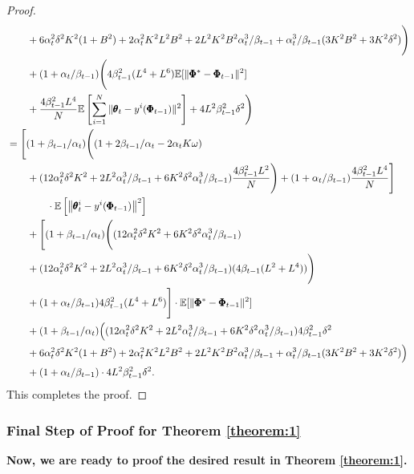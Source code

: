 \documentclass{article} %
\theoremstyle{plain}
\theoremstyle{definition}
\theoremstyle{remark}
\begin{document}
{\begin{proof}
\begin{align}
    &\qquad+6\alpha_t^2\delta^2K^2(1+B^2)+2\alpha_t^2K^2L^2B^2+2L^2K^2B^2\alpha_t^3/\beta_{t-1}+\alpha_t^3/\beta_{t-1}(3K^2B^2+3K^2\delta^2)\Bigg)\nonumber\allowdisplaybreaks\\
    &\qquad+(1+\alpha_t/\beta_{t-1})\Bigg(4\beta_{t-1}^2(L^4+L^6)\mathbb{E}[\|\pmb{\Phi}^*-\pmb{\Phi}_{t-1}\|^2]\nonumber\allowdisplaybreaks\\
    &\qquad+\frac{4\beta_{t-1}^2L^4}{N}\mathbb{E}\left[\sum_{i=1}^N\|\pmb{\theta}_{t}-y^i(\pmb{\Phi}_{t-1})\|^2\right]+4L^2\beta_{t-1}^2\delta^2\Bigg)\nonumber\allowdisplaybreaks\\
    &=\Bigg[(1+\beta_{t-1}/\alpha_t)\Bigg((1+2\beta_{t-1}/\alpha_t-2\alpha_tK\omega)\nonumber\allowdisplaybreaks\\
    &\qquad+(12\alpha_t^2\delta^2K^2+2L^2\alpha_t^3/\beta_{t-1}+6K^2\delta^2\alpha_t^3/\beta_{t-1})\frac{4\beta_{t-1}^2L^2}{N}\Bigg)+(1+\alpha_t/\beta_{t-1})\frac{4\beta_{t-1}^2L^4}{N}\Bigg]\nonumber\allowdisplaybreaks\\
    &\qquad\qquad\cdot\mathbb{E}\left[\left\|\pmb{\theta}_{t}^i-y^i(\pmb{\Phi}_{t-1})\right\|^2 \right]\nonumber\allowdisplaybreaks\\
    &\qquad+\Bigg[(1+\beta_{t-1}/\alpha_t)\Bigg((12\alpha_t^2\delta^2K^2+6K^2\delta^2\alpha_t^3/\beta_{t-1})\nonumber\allowdisplaybreaks\\
    &\qquad +(12\alpha_t^2\delta^2K^2+2L^2\alpha_t^3/\beta_{t-1}+6K^2\delta^2\alpha_t^3/\beta_{t-1})(4\beta_{t-1}(L^2+L^4))\Bigg)\nonumber\allowdisplaybreaks\\
   &\qquad+(1+\alpha_t/\beta_{t-1})4\beta_{t-1}^2(L^4+L^6)\Bigg]\cdot\mathbb{E}[\|\pmb{\Phi}^*-\pmb{\Phi}_{t-1}\|^2]\nonumber\allowdisplaybreaks\\
   &\qquad+(1+\beta_{t-1}/\alpha_t)\Big((12\alpha_t^2\delta^2K^2+2L^2\alpha_t^3/\beta_{t-1}+6K^2\delta^2\alpha_t^3/\beta_{t-1})4\beta_{t-1}^2\delta^2\nonumber\allowdisplaybreaks\\
   &\qquad+6\alpha_t^2\delta^2K^2(1+B^2)+2\alpha_t^2K^2L^2B^2+2L^2K^2B^2\alpha_t^3/\beta_{t-1}+\alpha_t^3/\beta_{t-1}(3K^2B^2+3K^2\delta^2)\Big)\nonumber\allowdisplaybreaks\\
   &\qquad+(1+\alpha_{t}/\beta_{t-1})\cdot 4L^2\beta_{t-1}^2\delta^2.
\end{align}
This completes the proof.
\end{proof}

\subsubsection{Final Step of Proof for Theorem \ref{theorem:1}}\label{sec:finalproof}
\textbf{Now, we are ready to proof the desired result in Theorem \ref{theorem:1}.}

}
\end{document}
